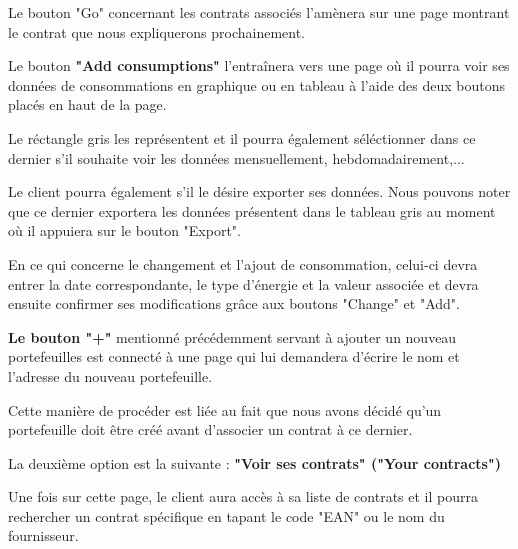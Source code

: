 \begin{flushleft}
Le bouton "Go" concernant les contrats associés l'amènera sur une page montrant le contrat que nous expliquerons prochainement.
\end{flushleft}

\begin{flushleft}
Le bouton \textbf{"Add consumptions"} l'entraînera vers une page où il pourra voir ses données de consommations en graphique ou en tableau à l'aide des deux boutons placés en haut de la page.
\end{flushleft}
\begin{flushleft}
Le réctangle gris les représentent et il pourra également séléctionner dans ce dernier s'il souhaite voir les données mensuellement, hebdomadairement,...
\end{flushleft}
\begin{flushleft}
Le client pourra également s'il le désire exporter ses données.
Nous pouvons noter que ce dernier exportera les données présentent dans le tableau gris au moment où il appuiera sur le bouton "Export".
\end{flushleft}
\begin{flushleft}
En ce qui concerne le changement et l'ajout de consommation, celui-ci devra entrer la date correspondante, le type d'énergie et la valeur associée et devra ensuite confirmer ses modifications grâce aux boutons "Change" et "Add".
\end{flushleft}

\begin{flushleft}
\textbf{Le bouton "+"} mentionné précédemment servant à ajouter un nouveau portefeuilles est connecté à une page qui lui demandera d'écrire le nom et l'adresse du nouveau portefeuille.
\end{flushleft}

\begin{flushleft}
Cette manière de procéder est liée au fait que nous avons décidé qu'un portefeuille doit être créé avant d'associer un contrat à ce dernier.
\end{flushleft}

\newpage

\begin{flushleft}
La deuxième option est la suivante : \textbf{"Voir ses contrats" ("Your contracts")}
\end{flushleft}

\begin{flushleft}
Une fois sur cette page, le client aura accès à sa liste de contrats et il pourra rechercher un contrat spécifique en tapant le code "EAN" ou le nom du fournisseur.
\end{flushleft}

